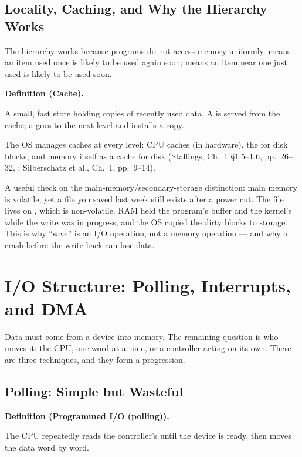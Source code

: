 \documentclass[11pt]{article}
\newenvironment{definitionbox}[1]{%
  \par\noindent\textbf{Definition (#1).}\ \itshape
}{\par\vspace{0.3em}}
\begin{document}
\subsection{Locality, Caching, and Why the Hierarchy Works}

The hierarchy works because programs do not access memory uniformly.  means an item used once is likely to be used again soon;  means an item near one just used is likely to be used soon.

\begin{definitionbox}{Cache}
A small, fast store holding copies of recently used data. A  is served from the cache; a  goes to the next level and installs a copy.
\end{definitionbox}

The OS manages caches at every level: CPU caches (in hardware), the  for disk blocks, and memory itself as a cache for disk (Stallings, Ch.~1 \S1.5--1.6, pp.~26--32, \cite{StallingsOS_internals_design_principles}; Silberschatz et al., Ch.~1, pp.~9--14).

A useful check on the main-memory/secondary-storage distinction: main memory is volatile, yet a file you saved last week still exists after a power cut. The file lives on , which is non-volatile. RAM held the program's buffer and the kernel's  while the write was in progress, and the OS copied the dirty blocks to storage. This is why ``save'' is an I/O operation, not a memory operation --- and why a crash before the write-back can lose data.

\section{I/O Structure: Polling, Interrupts, and DMA}
\label{sec:io}

Data must come from a device into memory. The remaining question is who moves it: the CPU, one word at a time, or a controller acting on its own. There are three techniques, and they form a progression.

\subsection{Polling: Simple but Wasteful}

\begin{definitionbox}{Programmed I/O (polling)}
The CPU repeatedly reads the controller's  until the device is ready, then moves the data word by word.
\end{definitionbox}
\end{document}
